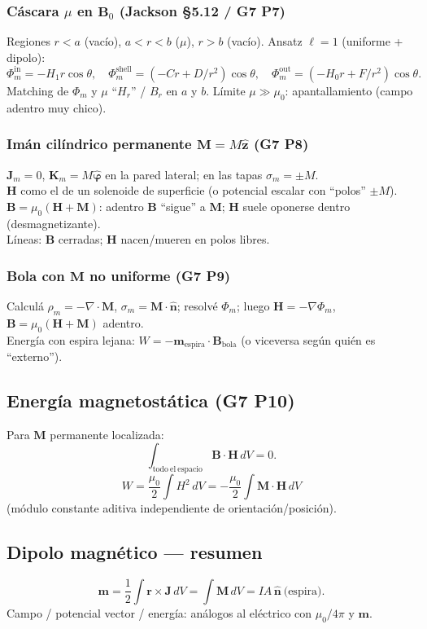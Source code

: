 \documentclass[10pt,a4paper]{article}
\newcommand{\vect}[1]{\mathbf{#1}}
\newcommand{\uv}[1]{\hat{\mathbf{#1}}}
\newcommand{\muo}{\mu_0}
\begin{document}
\subsubsection{Cáscara $\mu$ en $\vect{B}_0$ (Jackson §5.12 / G7 P7)}
Regiones $r<a$ (vacío), $a<r<b$ ($\mu$), $r>b$ (vacío). Ansatz $\ell=1$ (uniforme + dipolo):
\[
\Phi_m^{\mathrm{in}}=-H_1 r\cos\theta,\quad
\Phi_m^{\mathrm{shell}}=(-C r+D/r^2)\cos\theta,\quad
\Phi_m^{\mathrm{out}}=(-H_0 r+F/r^2)\cos\theta.
\]
Matching de $\Phi_m$ y $\mu$ ``$H_r$'' / $B_r$ en $a$ y $b$. Límite $\mu\gg\muo$: apantallamiento (campo adentro muy chico).

\subsubsection{Imán cilíndrico permanente $\vect{M}=M\uv{z}$ (G7 P8)}
$\vect{J}_m=0$, $\vect{K}_m=M\uv{\varphi}$ en la pared lateral; en las tapas $\sigma_m=\pm M$.\\
$\vect{H}$ como el de un solenoide de superficie (o potencial escalar con ``polos'' $\pm M$).\\
$\vect{B}=\muo(\vect{H}+\vect{M})$: adentro $\vect{B}$ ``sigue'' a $\vect{M}$; $\vect{H}$ suele oponerse dentro (desmagnetizante).\\
Líneas: $\vect{B}$ cerradas; $\vect{H}$ nacen/mueren en polos libres.

\subsubsection{Bola con $\vect{M}$ no uniforme (G7 P9)}
Calculá $\rho_m=-\nabla\cdot\vect{M}$, $\sigma_m=\vect{M}\cdot\uv{n}$; resolvé $\Phi_m$; luego $\vect{H}=-\nabla\Phi_m$, $\vect{B}=\muo(\vect{H}+\vect{M})$ adentro.\\
Energía con espira lejana: $W=-\vect{m}_{\mathrm{espira}}\cdot\vect{B}_{\mathrm{bola}}$ (o viceversa según quién es ``externo'').

\subsection{Energía magnetostática (G7 P10)}
Para $\vect{M}$ permanente localizada:
\[
\int_{\mathrm{todo\ el\ espacio}}\vect{B}\cdot\vect{H}\,dV=0.
\]
\[
W=\frac{\muo}{2}\int H^2\,dV=-\frac{\muo}{2}\int\vect{M}\cdot\vect{H}\,dV
\]
(módulo constante aditiva independiente de orientación/posición).

\subsection{Dipolo magnético --- resumen}
\[
\vect{m}=\frac12\int\vect{r}\times\vect{J}\,dV=\int\vect{M}\,dV=I A\,\uv{n}\ \text{(espira)}.
\]
Campo / potencial vector / energía: análogos al eléctrico con $\muo/4\pi$ y $\vect{m}$.
\end{document}
